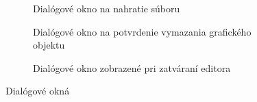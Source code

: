 \begin{figure}
	\centering
	\begin{subfigure}[t]{0.48\linewidth}	
		\caption{Dialógové okno na nahratie súboru}
	\end{subfigure}
	\quad
	\begin{subfigure}[t]{0.48\linewidth}	
		\caption{Dialógové okno na potvrdenie vymazania grafického objektu}
	\end{subfigure}
	\quad
	\begin{subfigure}[t]{0.7\linewidth}	
		\caption{Dialógové okno zobrazené pri zatváraní editora}
	\end{subfigure}
	
	\caption{Dialógové okná}
\end{figure}


